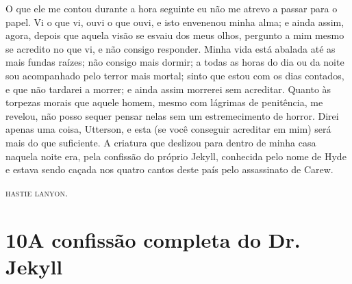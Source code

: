 O que ele me contou durante a hora seguinte eu não me atrevo a passar
para o papel.  Vi o que vi, ouvi o que ouvi, e isto envenenou minha
alma; e ainda assim, agora, depois que aquela visão se esvaiu dos meus
olhos, pergunto a mim mesmo se acredito no que vi, e não consigo
responder.  Minha vida está abalada até as mais fundas raízes; não
consigo mais dormir; a todas as horas do dia ou da noite sou
acompanhado pelo terror mais mortal; sinto que estou com os dias
contados, e que não tardarei a morrer; e ainda assim morrerei sem
acreditar.  Quanto às torpezas morais que aquele homem, mesmo com
lágrimas de penitência, me revelou, não posso sequer pensar nelas sem
um estremecimento de horror.  Direi apenas uma coisa, Utterson, e esta
(se você conseguir acreditar em mim) será mais do que suficiente.  A
criatura que deslizou para dentro de minha casa naquela noite era, pela
confissão do próprio Jekyll, conhecida pelo nome de Hyde e estava sendo
caçada nos quatro cantos deste país pelo assassinato de Carew.

\textsc{hastie lanyon}.


\chapter[10 -- A confissão completa do Dr. Jekyll]{10\break A confissão completa do Dr. Jekyll}

